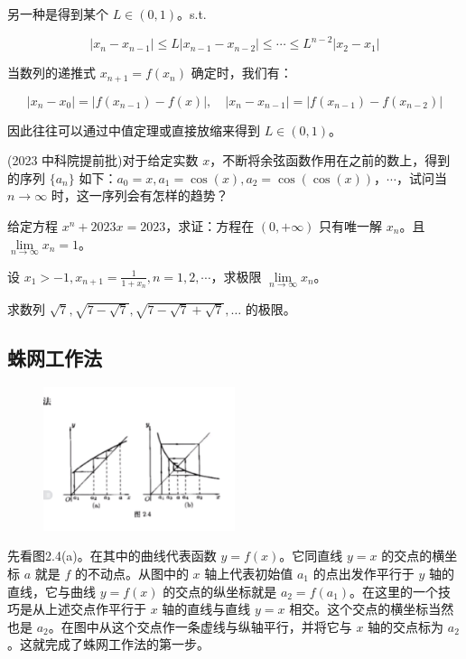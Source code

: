 \documentclass[lang=cn,10pt,thmcnt=section]{elegantbook}
\begin{document}
另一种是得到某个 \( L \in (0,1) \)。s.t.

\[|x_n - x_{n-1}| \leq L |x_{n-1} - x_{n-2}| \leq \cdots \leq L^{n-2} |x_2 - x_1|\]

当数列的递推式 \( x_{n+1} = f(x_n) \) 确定时，我们有：

\[|x_n - x_0| = |f(x_{n-1}) - f(x)|, \quad |x_n - x_{n-1}| = |f(x_{n-1}) - f(x_{n-2})|\]

因此往往可以通过中值定理或直接放缩来得到 \( L \in (0,1) \)。


\begin{example}
	(2023 中科院提前批)对于给定实数 \( x \)，不断将余弦函数作用在之前的数上，得到的序列 \(\{a_n\}\) 如下：\( a_0 = x, a_1 = \cos(x), a_2 = \cos(\cos(x)) \)，\(\cdots\)，试问当 \( n \to \infty \) 时，这一序列会有怎样的趋势？
\end{example}
\begin{example}
	给定方程 \(x^n + 2023x = 2023\)，求证：方程在 \((0,+\infty)\) 只有唯一解 \(x_n\)。且 \(\lim\limits_{n \to \infty} x_n = 1\)。

\end{example}
\begin{example}
	设 \(x_1 > -1, x_{n+1} = \frac{1}{1+x_n}, n = 1, 2, \cdots\)，求极限 \(\lim\limits_{n \to \infty} x_n\)。
\end{example}
\begin{example}
	求数列 \(\sqrt{7}, \sqrt{7-\sqrt{7}}, \sqrt{7-\sqrt{7}+\sqrt{7}}, \ldots\) 的极限。
\end{example}
\subsection{蛛网工作法}
\begin{figure}[h]
	\centering
	\includegraphics[width=0.5\textwidth]{figure/1.PNG}
\end{figure}
先看图2.4(a)。在其中的曲线代表函数 \( y = f(x) \)。它同直线 \( y = x \) 的交点的横坐标 \( a \) 就是 \( f \) 的不动点。从图中的 \( x \) 轴上代表初始值 \( a_1 \) 的点出发作平行于 \( y \) 轴的直线，它与曲线 \( y = f(x) \) 的交点的纵坐标就是 \( a_2 = f(a_1) \)。在这里的一个技巧是从上述交点作平行于 \( x \) 轴的直线与直线 \( y = x \) 相交。这个交点的横坐标当然也是 \( a_2 \)。在图中从这个交点作一条虚线与纵轴平行，并将它与 \( x \) 轴的交点标为 \( a_2 \)。这就完成了蛛网工作法的第一步。
\end{document}
